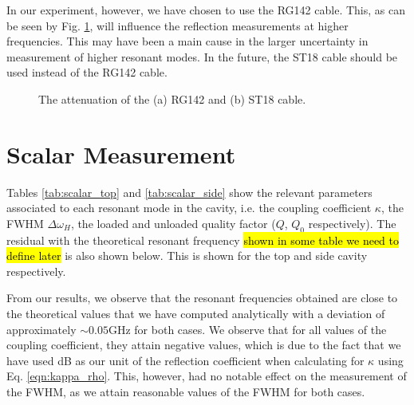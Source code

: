 \documentclass[a4paper]{report}
\numberwithin{equation}{section}
\begin{document}
In our experiment, however, we have chosen to use the RG142 cable. This, as can be seen by Fig. \ref{fig:coax_atten}, will influence the reflection
measurements at higher frequencies. This may have been a main cause in the larger uncertainty in measurement of higher resonant modes. In the future,
the ST18 cable should be used instead of the RG142 cable. \par 

\begin{figure}[htb!]
	\centering
	\quad

	\caption{The attenuation of the (a) RG142 and (b) ST18 cable. }
	\label{fig:coax_atten}
\end{figure}


\section{Scalar Measurement}

Tables \ref{tab:scalar_top} and \ref{tab:scalar_side} show the relevant parameters associated to each resonant mode in the cavity, i.e. the coupling coefficient $\kappa$, 
the FWHM $\Delta\omega_H$, the loaded and unloaded quality factor ($Q$, $Q_0$ respectively). The residual with the theoretical resonant frequency \hl{shown in some table we need to define later}
 is also shown below. This is shown for the top and side cavity respectively. \par 

From our results, we observe that the resonant frequencies obtained are close to the theoretical values that we have computed analytically with a deviation of approximately 
$\sim 0.05 \si{\giga\hertz}$ for both cases. We observe that for all values of the coupling coefficient, they attain negative values, which is due to the fact that we have used 
dB as our unit of the reflection coefficient when calculating for $\kappa$ using Eq. \ref{eqn:kappa_rho}. This, however, had no notable effect on the measurement of the FWHM, as 
we attain reasonable values of the FWHM for both cases. \par 
\end{document}
